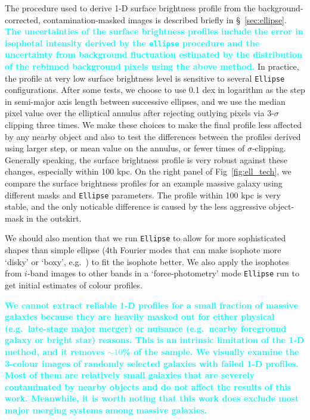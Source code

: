 \documentclass[fleqn,usenatbib]{mnras}
\newcommand{\song}[1]{\textcolor{cyan}{\textbf{#1}}}
\begin{document}
    The procedure used to derive 1-D surface brightness profile from the 
    background-corrected, contamination-masked images is  described briefly in 
    \S~\ref{sec:ellipse}. 
    \song{
    The uncertainties of the surface brightness profiles include the error in 
    isophotal intensity derived by the \texttt{ellipse} procedure and the 
    uncertainty from background fluctuation estimated by the distribution of the 
    rebinned background pixels using the above method. 
    }
    In practice, the profile at very low surface brightness level is sensitive to 
    several \texttt{Ellipse} configurations.
    After some tests, we choose to use 0.1 dex in logarithm as the step in semi-major 
    axis length between successive ellipses, and we use the median pixel value over 
    the elliptical annulus after rejecting outlying pixels via 3-$\sigma$ clipping 
    three times.
    We make these  choices to make the final profile less affected by any nearby
    object and also to test the differences between the profiles derived using larger
    step, or mean value on the annulus, or fewer times of $\sigma$-clipping. 
    Generally speaking, the surface brightness profile is very robust against these
    changes, especially within 100 kpc. 
    On the right panel of Fig~\ref{fig:ell_tech}, we compare the surface brightness
    profiles for an example massive galaxy using different masks and \texttt{Ellipse}
    parameters. 
    The profile within 100 kpc is very stable, and the only noticable difference 
    is caused by the less aggressive object-mask in the outskirt.    
    
    We should also mention that we run \texttt{Ellipse} to allow for more 
    sophisticated shapes than simple ellipse (4th Fourier modes that can make 
    isophote more `disky' or `boxy', e.g.\ \citealt{Kormendy2009}) to fit the 
    isophote better.
    We also apply the isophotes from $i$-band images to other bands in a
    `force-photometry' mode \texttt{Ellipse} run to get initial estimates of 
    colour profiles.  
    
    \song{
    We cannot extract reliable 1-D profiles for a small fraction of massive
    galaxies because they are heavily masked out for either physical 
    (e.g.\ late-stage major merger) or nuisance (e.g.\ nearby foreground 
    galaxy or bright star) reasons. 
    This is an intrinsic limitation of the 1-D method, and it removes ${\sim}10$\% 
    of the sample.
    We visually examine the 3-colour images of randomly selected galaxies with 
    failed 1-D profiles.  
    Most of them are relatively small galaxies that are severely contaminated by 
    nearby objects and do not affect the results of this work.  
    Meanwhile, it is worth noting that this work does exclude most major merging 
    systems among massive galaxies. 
    }
\end{document}

